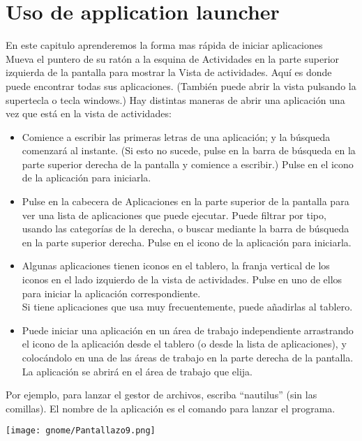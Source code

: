 \chapter{Uso de application launcher}
En este capitulo aprenderemos la forma mas rápida de iniciar aplicaciones\\

Mueva el puntero de su ratón a la esquina de Actividades en la parte superior izquierda de la pantalla para mostrar la Vista de actividades. Aquí es donde puede encontrar todas sus aplicaciones. (También puede abrir la vista pulsando la supertecla o tecla windows.)
Hay distintas maneras de abrir una aplicación una vez que está en la vista de actividades:
\begin{itemize}
\item Comience a escribir las primeras letras de una aplicación; y la búsqueda comenzará al instante. (Si esto no sucede, pulse en la barra de búsqueda en la parte superior derecha de la pantalla y comience a escribir.) Pulse en el icono de la aplicación para iniciarla.
\item Pulse en la cabecera de Aplicaciones en la parte superior de la pantalla para ver una lista de aplicaciones que puede ejecutar. Puede filtrar por tipo, usando las categorías de la derecha, o buscar mediante la barra de búsqueda en la parte superior derecha. Pulse en el icono de la aplicación para iniciarla.
\item Algunas aplicaciones tienen iconos en el tablero, la franja vertical de los iconos en el lado izquierdo de la vista de actividades. Pulse en uno de ellos para iniciar la aplicación correspondiente.\\
Si tiene aplicaciones que usa muy frecuentemente, puede añadirlas al tablero.
\item Puede iniciar una aplicación en un área de trabajo independiente arrastrando el icono de la aplicación desde el tablero (o desde la lista de aplicaciones), y colocándolo en una de las áreas de trabajo en la parte derecha de la pantalla. La aplicación se abrirá en el área de trabajo que elija.
\end{itemize}
Por ejemplo, para lanzar el gestor de archivos, escriba “nautilus” (sin las comillas). El nombre de la aplicación es el comando para lanzar el programa.
\begin{center}
\texttt{[image: gnome/Pantallazo9.png]} 
\end{center}